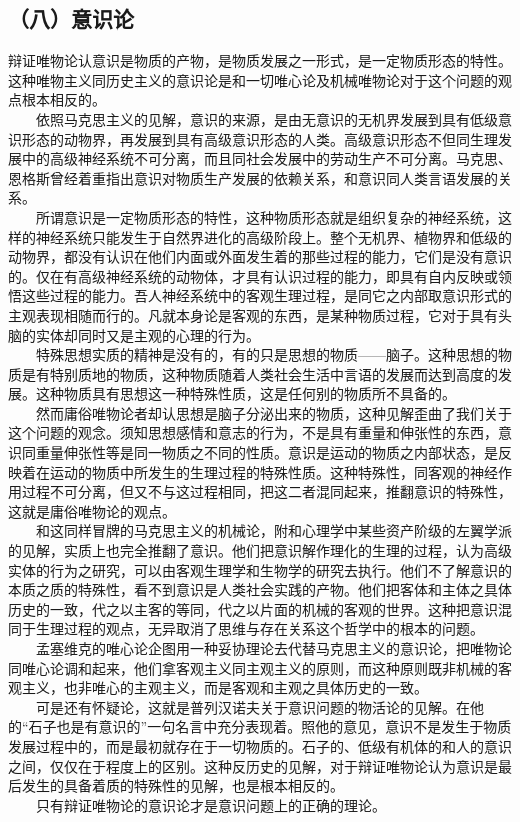 \documentclass[cn,11pt,chinese]{elegantbook}
\def\myformat#1{\hfil\hfil #1}
\begin{document}
\subsection*{\myformat{（八）意识论}}
辩证唯物论认意识是物质的产物，是物质发展之一形式，是一定物质形态的特性。这种唯物主义同历史主义的意识论是和一切唯心论及机械唯物论对于这个问题的观点根本相反的。 \\
　　依照马克思主义的见解，意识的来源，是由无意识的无机界发展到具有低级意识形态的动物界，再发展到具有高级意识形态的人类。高级意识形态不但同生理发展中的高级神经系统不可分离，而且同社会发展中的劳动生产不可分离。马克思、恩格斯曾经着重指出意识对物质生产发展的依赖关系，和意识同人类言语发展的关系。\\
　　所谓意识是一定物质形态的特性，这种物质形态就是组织复杂的神经系统，这样的神经系统只能发生于自然界进化的高级阶段上。整个无机界、植物界和低级的动物界，都没有认识在他们内面或外面发生着的那些过程的能力，它们是没有意识的。仅在有高级神经系统的动物体，才具有认识过程的能力，即具有自内反映或领悟这些过程的能力。吾人神经系统中的客观生理过程，是同它之内部取意识形式的主观表现相随而行的。凡就本身论是客观的东西，是某种物质过程，它对于具有头脑的实体却同时又是主观的心理的行为。\\
　　特殊思想实质的精神是没有的，有的只是思想的物质——脑子。这种思想的物质是有特别质地的物质，这种物质随着人类社会生活中言语的发展而达到高度的发展。这种物质具有思想这一种特殊性质，这是任何别的物质所不具备的。\\
　　然而庸俗唯物论者却认思想是脑子分泌出来的物质，这种见解歪曲了我们关于这个问题的观念。须知思想感情和意志的行为，不是具有重量和伸张性的东西，意识同重量伸张性等是同一物质之不同的性质。意识是运动的物质之内部状态，是反映着在运动的物质中所发生的生理过程的特殊性质。这种特殊性，同客观的神经作用过程不可分离，但又不与这过程相同，把这二者混同起来，推翻意识的特殊性，这就是庸俗唯物论的观点。\\
　　和这同样冒牌的马克思主义的机械论，附和心理学中某些资产阶级的左翼学派的见解，实质上也完全推翻了意识。他们把意识解作理化的生理的过程，认为高级实体的行为之研究，可以由客观生理学和生物学的研究去执行。他们不了解意识的本质之质的特殊性，看不到意识是人类社会实践的产物。他们把客体和主体之具体历史的一致，代之以主客的等同，代之以片面的机械的客观的世界。这种把意识混同于生理过程的观点，无异取消了思维与存在关系这个哲学中的根本的问题。\\
　　孟塞维克的唯心论企图用一种妥协理论去代替马克思主义的意识论，把唯物论同唯心论调和起来，他们拿客观主义同主观主义的原则，而这种原则既非机械的客观主义，也非唯心的主观主义，而是客观和主观之具体历史的一致。\\
　　可是还有怀疑论，这就是普列汉诺夫关于意识问题的物活论的见解。在他的“石子也是有意识的”一句名言中充分表现着。照他的意见，意识不是发生于物质发展过程中的，而是最初就存在于一切物质的。石子的、低级有机体的和人的意识之间，仅仅在于程度上的区别。这种反历史的见解，对于辩证唯物论认为意识是最后发生的具备着质的特殊性的见解，也是根本相反的。\\
　　只有辩证唯物论的意识论才是意识问题上的正确的理论。\\
\end{document}
